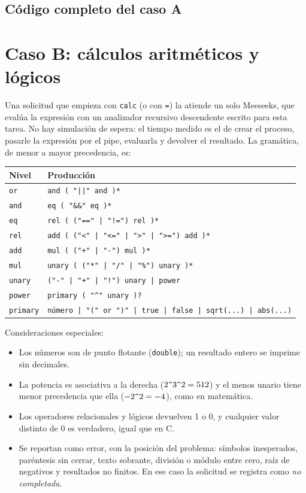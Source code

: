 \documentclass[11pt,letterpaper]{article}
\makeatletter
\newcommand{\codigo}[2]{%
  \edef\lin{\csname line@#1\endcsname}%
  }
\makeatother
\begin{document}
\subsection{Código completo del caso A}

\codigo{text}{Atención de una solicitud de texto}

\section{Caso B: cálculos aritméticos y lógicos}\label{sec:b}

Una solicitud que empieza con \texttt{calc} (o con \texttt{=}) la atiende un solo
Meeseeks, que evalúa la expresión con un analizador recursivo descendente escrito para esta
tarea. No hay simulación de espera: el tiempo medido es el de crear el proceso, pasarle la
expresión por el pipe, evaluarla y devolver el resultado. La gramática, de menor a mayor
precedencia, es:

\begin{center}
\begin{tabular}{ll}
\toprule
Nivel & Producción \\
\midrule
\texttt{or}      & \texttt{and ( "||" and )*} \\
\texttt{and}     & \texttt{eq ( "\&\&" eq )*} \\
\texttt{eq}      & \texttt{rel ( ("==" | "!=") rel )*} \\
\texttt{rel}     & \texttt{add ( ("<" | "<=" | ">" | ">=") add )*} \\
\texttt{add}     & \texttt{mul ( ("+" | "-") mul )*} \\
\texttt{mul}     & \texttt{unary ( ("*" | "/" | "\%") unary )*} \\
\texttt{unary}   & \texttt{("-" | "+" | "!") unary | power} \\
\texttt{power}   & \texttt{primary ( "\^{}" unary )?} \\
\texttt{primary} & \texttt{número | "(" or ")" | true | false | sqrt(...) | abs(...)} \\
\bottomrule
\end{tabular}
\end{center}

Consideraciones especiales:
\begin{itemize}[leftmargin=1.5em]
\item Los números son de punto flotante (\texttt{double}); un resultado entero se imprime
  sin decimales.
\item La potencia es asociativa a la derecha ($2\verb|^|3\verb|^|2=512$) y el menos unario
  tiene menor precedencia que ella ($-2\verb|^|2=-4$), como en matemática.
\item Los operadores relacionales y lógicos devuelven 1 o 0, y cualquier valor distinto de
  0 es verdadero, igual que en C.
\item Se reportan como error, con la posición del problema: símbolos inesperados,
  paréntesis sin cerrar, texto sobrante, división o módulo entre cero, raíz de negativos y
  resultados no finitos. En ese caso la solicitud se registra como \emph{no completada}.
\end{itemize}
\end{document}

